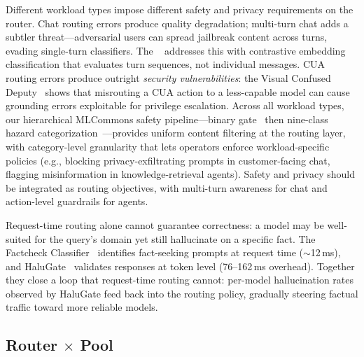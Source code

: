 \begin{observation}
\label{obs:wr-safety}
Different workload types impose different safety and privacy
requirements on the router.  Chat routing errors produce quality
degradation; multi-turn chat adds a subtler threat---adversarial
users can spread jailbreak content across turns, evading
single-turn classifiers.  The \vsr{}~\cite{vllmsr2026} addresses
this with contrastive embedding classification that evaluates turn
sequences, not individual messages.  CUA routing errors produce
outright \emph{security vulnerabilities}: the Visual Confused
Deputy~\cite{vcd2026} shows that misrouting a CUA action to a
less-capable model can cause grounding errors exploitable for
privilege escalation.  Across all workload types, our hierarchical
MLCommons safety pipeline---binary gate~\cite{safetyl1_2026} then
nine-class hazard categorization~\cite{safetyl2_2026}---provides
uniform content filtering at the routing layer, with category-level
granularity that lets operators enforce workload-specific policies
(e.g., blocking privacy-exfiltrating prompts in customer-facing chat,
flagging misinformation in knowledge-retrieval agents).  Safety and privacy should be integrated as routing objectives,
with multi-turn awareness for chat and action-level guardrails for
agents.
\end{observation}

\begin{observation}
\label{obs:wr-halu}
Request-time routing alone cannot guarantee correctness: a model may
be well-suited for the query's domain yet still hallucinate on a
specific fact.  The Factcheck Classifier~\cite{factcheck2026}
identifies fact-seeking prompts at request time ($\sim$12\,ms), and
HaluGate~\cite{halugate2025} validates responses at token level
(76--162\,ms overhead).  Together they close a loop that
request-time routing cannot: per-model hallucination rates observed
by HaluGate feed back into the routing policy, gradually steering
factual traffic toward more reliable models.
\end{observation}


\subsection{Router $\times$ Pool}
\label{sec:cross:rp}

